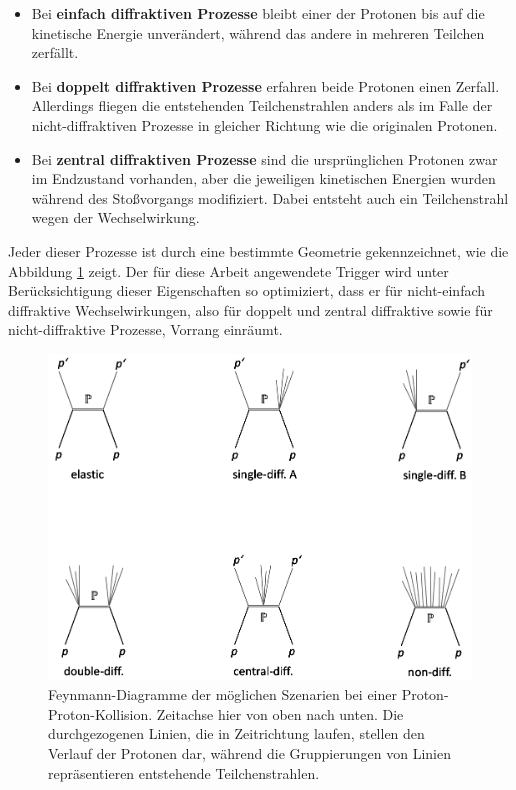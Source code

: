 \documentclass[12pt,a4paper]{report}
\begin{document}
\begin{itemize}
 \item Bei \textbf{einfach diffraktiven Prozesse} bleibt einer der Protonen bis auf die kinetische Energie unverändert, während das andere in mehreren Teilchen zerfällt.
 \item Bei \textbf{doppelt diffraktiven Prozesse} erfahren beide Protonen einen Zerfall. Allerdings fliegen die entstehenden Teilchenstrahlen anders als im Falle der nicht-diffraktiven Prozesse in gleicher Richtung wie die originalen Protonen.
 \item Bei \textbf{zentral diffraktiven Prozesse} sind die ursprünglichen Protonen zwar im Endzustand vorhanden, aber die jeweiligen kinetischen Energien wurden während des Stoßvorgangs modifiziert. Dabei entsteht auch ein Teilchenstrahl wegen der Wechselwirkung.
\end{itemize}
Jeder dieser Prozesse ist durch eine bestimmte Geometrie gekennzeichnet, wie die Abbildung \ref{Diffractiv} zeigt. Der für diese Arbeit angewendete Trigger wird unter Berücksichtigung dieser Eigenschaften so optimiziert, dass er für nicht-einfach diffraktive Wechselwirkungen, also für doppelt und zentral diffraktive sowie für nicht-diffraktive Prozesse, Vorrang einräumt.\\
\begin{figure}
\centering
\includegraphics[width=13cm]{DiffractiveProzesse.png} 
\caption{Feynmann-Diagramme der möglichen Szenarien bei einer Proton-Proton-Kollision. Zeitachse hier von oben nach unten. Die durchgezogenen Linien, die in Zeitrichtung laufen, stellen den Verlauf der Protonen dar, während die Gruppierungen von Linien repräsentieren entstehende Teilchenstrahlen.}
\label{Diffractiv}
\end{figure}
\end{document}
